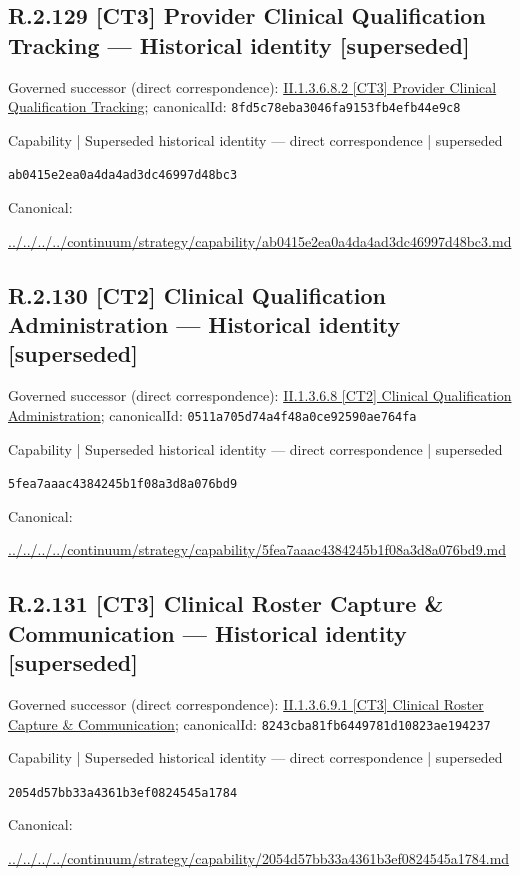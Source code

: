 \documentclass[10pt,a4paper]{article}
\begin{document}
\subsection*{R.2.129 [CT3] Provider Clinical Qualification Tracking — Historical identity [superseded]}
Governed successor (direct correspondence): \hyperref[element-8fd5c78eba3046fa9153fb4efb44e9c8]{II.1.3.6.8.2 [CT3] Provider Clinical Qualification Tracking}; canonicalId: \texttt{8fd5c78eba3046fa9153fb4efb44e9c8}\par
\label{element-ab0415e2ea0a4da4ad3dc46997d48bc3}
{\small Capability | Superseded historical identity — direct correspondence | superseded}\par
\texttt{ab0415e2ea0a4da4ad3dc46997d48bc3}\par
Canonical: \par
{\footnotesize\url{../../../../continuum/strategy/capability/ab0415e2ea0a4da4ad3dc46997d48bc3.md}}\par
\subsection*{R.2.130 [CT2] Clinical Qualification Administration — Historical identity [superseded]}
Governed successor (direct correspondence): \hyperref[element-0511a705d74a4f48a0ce92590ae764fa]{II.1.3.6.8 [CT2] Clinical Qualification Administration}; canonicalId: \texttt{0511a705d74a4f48a0ce92590ae764fa}\par
\label{element-5fea7aaac4384245b1f08a3d8a076bd9}
{\small Capability | Superseded historical identity — direct correspondence | superseded}\par
\texttt{5fea7aaac4384245b1f08a3d8a076bd9}\par
Canonical: \par
{\footnotesize\url{../../../../continuum/strategy/capability/5fea7aaac4384245b1f08a3d8a076bd9.md}}\par
\subsection*{R.2.131 [CT3] Clinical Roster Capture \& Communication — Historical identity [superseded]}
Governed successor (direct correspondence): \hyperref[element-8243cba81fb6449781d10823ae194237]{II.1.3.6.9.1 [CT3] Clinical Roster Capture \& Communication}; canonicalId: \texttt{8243cba81fb6449781d10823ae194237}\par
\label{element-2054d57bb33a4361b3ef0824545a1784}
{\small Capability | Superseded historical identity — direct correspondence | superseded}\par
\texttt{2054d57bb33a4361b3ef0824545a1784}\par
Canonical: \par
{\footnotesize\url{../../../../continuum/strategy/capability/2054d57bb33a4361b3ef0824545a1784.md}}\par
\end{document}
